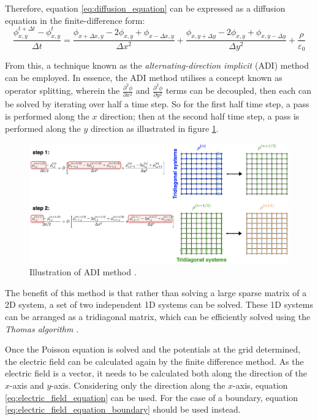 Therefore, equation \ref{eq:diffusion_equation} can be expressed as a diffusion equation in the finite-difference form:
\begin{equation}
	\frac{\phi_{x, y}^{t + \Delta t} - \phi_{x, y}^t}{\Delta t} = \frac{\phi_{x + \Delta x, y} - 2\phi_{x,y} + \phi_{x - \Delta x, y}}{\Delta x^2} + \frac{\phi_{x, y + \Delta y} - 2\phi_{x,y} + \phi_{x, y - \Delta y}}{\Delta y^2} + \frac{\rho}{\varepsilon_0}
	\label{eq:poisson_equation_finite_difference}
\end{equation}

From this, a technique known as the \textit{alternating-direction implicit} (ADI) method can be employed. In essence, the ADI method utilises a concept known as operator splitting, wherein the $\frac{\partial^2 \phi}{\partial x^2}$ and $\frac{\partial^2 \phi}{\partial y^2}$ terms can be decoupled, then each can be solved by iterating over half a time step. So for the first half time step, a pass is performed along the $x$ direction; then at the second half time step, a pass is performed along the $y$ direction as illustrated in figure \ref{fig:adi}. 

\begin{figure}[h!]
	\centering
	\includegraphics[width=\linewidth]{particle_in_cell/figures/adi.png}
	\caption{Illustration of ADI method \cite{Wermelinger}.}
	\label{fig:adi}
\end{figure} 

The benefit of this method is that rather than solving a large sparse matrix of a 2D system, a set of two independent 1D systems can be solved. These 1D systems can be arranged as a tridiagonal matrix, which can be efficiently solved using the \textit{Thomas algorithm} \cite{Press1988C1}. 

Once the Poisson equation is solved and the potentials at the grid determined, the electric field can be calculated again by the finite difference method. As the electric field is a vector, it needs to be calculated both along the direction of the $x$-axis and $y$-axis. Considering only the direction along the $x$-axis, equation \ref{eq:electric_field_equation} can be used. For the case of a boundary, equation \ref{eq:electric_field_equation_boundary} should be used instead.

